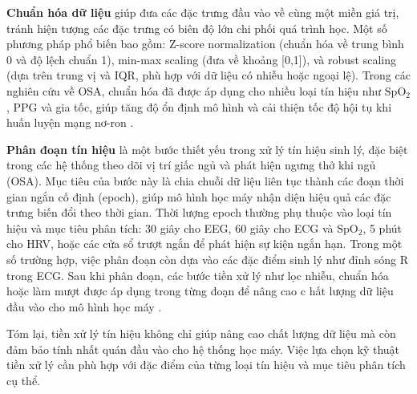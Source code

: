 \textbf{Chuẩn hóa dữ liệu}  giúp đưa các đặc trưng đầu vào về cùng một miền giá trị,
tránh hiện tượng các đặc trưng có biên độ lớn chi phối quá trình học.
Một số phương pháp phổ biến bao gồm: Z-score normalization
(chuẩn hóa về trung bình 0 và độ lệch chuẩn 1),
min-max scaling (đưa về khoảng [0,1]), và robust scaling
(dựa trên trung vị và IQR, phù hợp với dữ liệu có nhiễu hoặc ngoại lệ).
Trong các nghiên cứu về OSA, chuẩn hóa đã được áp dụng cho nhiều
loại tín hiệu như $\mathrm{SpO_2}$, PPG và gia tốc, giúp tăng độ ổn định
mô hình và cải thiện tốc độ hội tụ khi huấn luyện mạng nơ-ron
\cite{Sleep_Posture_Detection, Vu2025SleepPosition, rossi2023sleep}.

\textbf{Phân đoạn tín hiệu} là một bước thiết yếu trong xử lý tín
hiệu sinh lý, đặc biệt trong các hệ thống theo dõi vị trí giấc ngủ và phát
hiện ngưng thở khi ngủ (OSA). Mục tiêu của bước này là chia chuỗi dữ
liệu liên tục thành các đoạn thời gian ngắn cố định (epoch),
giúp mô hình học máy nhận diện hiệu quả các đặc trưng biến đổi theo
thời gian. Thời lượng epoch thường phụ thuộc vào loại tín hiệu và
mục tiêu phân tích: 30 giây cho EEG, 60 giây cho ECG và $\mathrm{SpO_2}$,
5 phút cho HRV, hoặc các cửa sổ trượt ngắn để phát hiện sự kiện ngắn hạn.
Trong một số trường hợp, việc phân đoạn còn dựa vào các đặc điểm sinh lý
như đỉnh sóng R trong ECG. Sau khi phân đoạn, các bước tiền xử lý như lọc nhiễu,
chuẩn hóa hoặc làm mượt được áp dụng trong từng đoạn để nâng cao c
hất lượng dữ liệu đầu vào cho mô hình học máy
\cite{Sleep_Posture_Detection, Vu2025SleepPosition, HOANG2025116309, zou2024mbtcn, osa_sanchez2025}.

Tóm lại, tiền xử lý tín hiệu không chỉ giúp nâng cao chất lượng dữ liệu mà còn
đảm bảo tính nhất quán đầu vào cho hệ thống học máy. Việc lựa chọn kỹ thuật
tiền xử lý cần phù hợp với đặc điểm của từng loại tín hiệu và mục tiêu phân
tích cụ thể.

